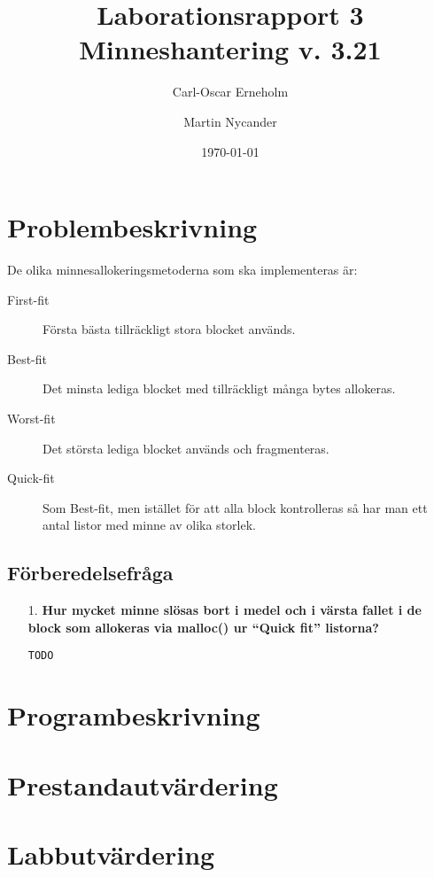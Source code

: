 \documentclass[a4paper,10pt,titlepage]{article}
\title{Laborationsrapport 3 \\ Minneshantering v. 3.21}
\author{Carl-Oscar Erneholm \and Martin Nycander}
\date{\today}
\begin{document}


\maketitle

\tableofcontents
\thispagestyle{empty}
\newpage
\setcounter{page}{1}
\section{Problembeskrivning}

De olika minnesallokeringsmetoderna som ska implementeras är:

\begin{description}
	\item[First-fit] Första bästa tillräckligt stora blocket används.
	\item[Best-fit] Det minsta lediga blocket med tillräckligt många bytes allokeras.
	\item[Worst-fit] Det största lediga blocket används och fragmenteras.
	\item[Quick-fit] Som Best-fit, men istället för att alla block kontrolleras så har man ett antal listor med minne av olika storlek.
\end{description}

\subsection{Förberedelsefråga}

\begin{enumerate}
	\item[1.] \textbf{\footnotesize Hur mycket minne slösas bort i medel och i värsta fallet i de block som allokeras via malloc() ur ``Quick fit'' listorna?}

	\verb!TODO!

\end{enumerate}

\newpage
\section{Programbeskrivning}

\newpage
\section{Prestandautvärdering}




\newpage
\section{Labbutvärdering}
\end{document}

